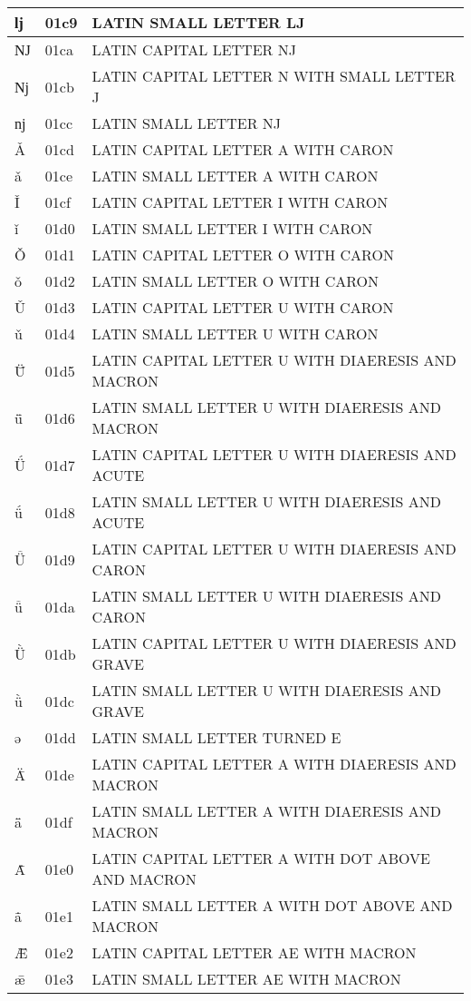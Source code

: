 \documentclass[12pt,letterpaper,openany]{book}
\begin{document}
\begin{center}
\begin{supertabular}{|m{0.25in}|m{0.5in}|m{4in}|}
ǉ & 01c9 & LATIN SMALL LETTER LJ\\\hline
Ǌ & 01ca & LATIN CAPITAL LETTER NJ\\\hline
ǋ & 01cb & LATIN CAPITAL LETTER N WITH SMALL LETTER J\\\hline
ǌ & 01cc & LATIN SMALL LETTER NJ\\\hline
Ǎ & 01cd & LATIN CAPITAL LETTER A WITH CARON\\\hline
ǎ & 01ce & LATIN SMALL LETTER A WITH CARON\\\hline
Ǐ & 01cf & LATIN CAPITAL LETTER I WITH CARON\\\hline
ǐ & 01d0 & LATIN SMALL LETTER I WITH CARON\\\hline
Ǒ & 01d1 & LATIN CAPITAL LETTER O WITH CARON\\\hline
ǒ & 01d2 & LATIN SMALL LETTER O WITH CARON\\\hline
Ǔ & 01d3 & LATIN CAPITAL LETTER U WITH CARON\\\hline
ǔ & 01d4 & LATIN SMALL LETTER U WITH CARON\\\hline
Ǖ & 01d5 & LATIN CAPITAL LETTER U WITH DIAERESIS AND MACRON\\\hline
ǖ & 01d6 & LATIN SMALL LETTER U WITH DIAERESIS AND MACRON\\\hline
Ǘ & 01d7 & LATIN CAPITAL LETTER U WITH DIAERESIS AND ACUTE\\\hline
ǘ & 01d8 & LATIN SMALL LETTER U WITH DIAERESIS AND ACUTE\\\hline
Ǚ & 01d9 & LATIN CAPITAL LETTER U WITH DIAERESIS AND CARON\\\hline
ǚ & 01da & LATIN SMALL LETTER U WITH DIAERESIS AND CARON\\\hline
Ǜ & 01db & LATIN CAPITAL LETTER U WITH DIAERESIS AND GRAVE\\\hline
ǜ & 01dc & LATIN SMALL LETTER U WITH DIAERESIS AND GRAVE\\\hline
ǝ & 01dd & LATIN SMALL LETTER TURNED E\\\hline
Ǟ & 01de & LATIN CAPITAL LETTER A WITH DIAERESIS AND MACRON\\\hline
ǟ & 01df & LATIN SMALL LETTER A WITH DIAERESIS AND MACRON\\\hline
Ǡ & 01e0 & LATIN CAPITAL LETTER A WITH DOT ABOVE AND MACRON\\\hline
ǡ & 01e1 & LATIN SMALL LETTER A WITH DOT ABOVE AND MACRON\\\hline
Ǣ & 01e2 & LATIN CAPITAL LETTER AE WITH MACRON\\\hline
ǣ & 01e3 & LATIN SMALL LETTER AE WITH MACRON\\\hline

\end{supertabular}
\end{center}
\end{document}
